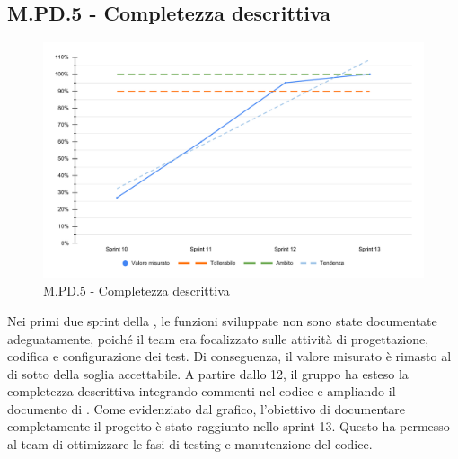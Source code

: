 \subsection{M.PD.5 - Completezza descrittiva}
 \begin{figure}[H]
    \centering
    \includegraphics[width=\textwidth]{assets/completezza_descrittiva.pdf}
    \caption{M.PD.5 - Completezza descrittiva}
\end{figure}

\par Nei primi due sprint della , le funzioni sviluppate non sono state documentate adeguatamente, poiché il team era focalizzato sulle attività di progettazione, codifica e configurazione dei test. Di conseguenza, il valore misurato è rimasto al di sotto della soglia accettabile. A partire dallo  12, il gruppo ha esteso la completezza descrittiva integrando commenti nel codice e ampliando il documento di \ST. Come evidenziato dal grafico, l'obiettivo di documentare completamente il progetto è stato raggiunto nello sprint 13. Questo ha permesso al team di ottimizzare le fasi di testing e manutenzione del codice.